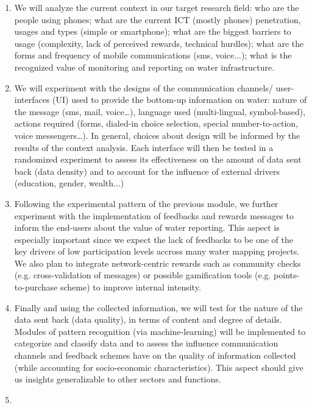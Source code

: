 \documentclass[11pt]{article}
\begin{document}
\begin{enumerate}
\item
We will analyze the current context in our target research field: who are the people using phones; what are the current ICT (mostly phones) penetration, usages and types (simple or smartphone); what are the biggest barriers to usage (complexity, lack of perceived rewards, technical hurdles); what are the forms and frequency of mobile communications (sms, voice...); what is the recognized value of monitoring and reporting on water infrastructure.
\item
We will experiment with the designs of the communication channels/ user-interfaces (UI) used to provide the bottom-up information on water: nature of the message (sms, mail, voice…), language used (multi-lingual, symbol-based), actions required (forms, dialed-in choice selection, special number-to-action, voice messengers…). In general, choices about design will be informed by the results of the context analysis. Each interface will then be tested in a randomized experiment to assess its effectiveness on the amount of data sent back (data density) and to account for the influence of external drivers (education, gender, wealth...)
\item
Following the experimental pattern of the previous module, we further experiment with the implementation of feedbacks and rewards messages to inform the end-users about the value of water reporting. 
This aspect is especially important since we expect the lack of feedbacks to be one of the key drivers of low participation levels accross many water mapping projects.
We also plan to integrate network-centric rewards such as community checks (e.g. cross-validation of messages) or possible gamification tools (e.g. points-to-purchase scheme) to improve internal intensity. 
\item
Finally and using the collected information, we will test for the nature of the data sent back (data quality), in terms of content and degree of details. Modules of pattern recognition (via machine-learning) will be implemented to categorize and classify data and to assess the influence communication channels and feedback schemes have on the quality of information collected (while accounting for socio-economic characteristics). This aspect should give us insights generalizable to other sectors and functions.
\item
\end{enumerate}  
\\\\
\end{document}
